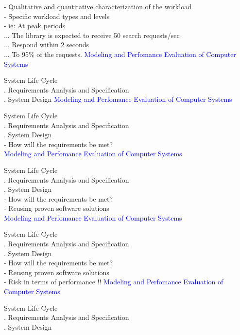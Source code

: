 \documentclass[svgnames]{beamer}
\begin{document}
- Qualitative and quantitative characterization of the workload \\
- Specific workload types and levels \\
- ie: At peak periods \\
 ... The library is expected to receive 50 search requests/sec\\
 ... Respond within 2 seconds \\
 ... To 95\% of the requests.
\newpage
\textcolor{blue}{Modeling and Perfomance Evaluation of Computer Systems} \\[38pt]
\raggedright
\! System Life Cycle\\
. Requirements Analysis and Specification\\
. System Design 
\newpage
\textcolor{blue}{Modeling and Perfomance Evaluation of Computer Systems} \\[38pt]
\raggedright
\! System Life Cycle\\
. Requirements Analysis and Specification\\
. System Design 
\\[20pt]
- How will the requirements be met?\\
\newpage
\textcolor{blue}{Modeling and Perfomance Evaluation of Computer Systems} \\[38pt]
\raggedright
\! System Life Cycle\\
. Requirements Analysis and Specification\\
. System Design 
\\[20pt]
- How will the requirements be met?\\
- Reusing proven software solutions \\
\newpage
\textcolor{blue}{Modeling and Perfomance Evaluation of Computer Systems} \\[38pt]
\raggedright
\! System Life Cycle\\
. Requirements Analysis and Specification\\
. System Design 
\\[20pt]
- How will the requirements be met?\\
- Reusing proven software solutions \\
- Risk in terms of performance !!
\newpage
\textcolor{blue}{Modeling and Perfomance Evaluation of Computer Systems} \\[38pt]
\raggedright
\! System Life Cycle\\
. Requirements Analysis and Specification\\
. System Design 
\end{document}
